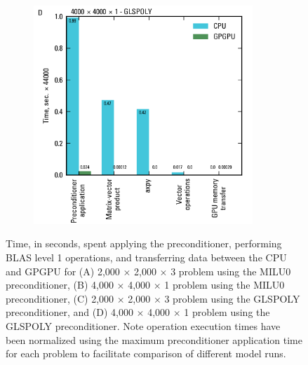\documentclass[12pt]{article}
\begin{document}
\begin{figure}[hp]
\begin{subfigure}[b]{0.5\textwidth}
	\end{subfigure}
	\begin{subfigure}[b]{0.5\textwidth}
		\centering
  		\includegraphics[width=8.25cm]{Figure4d.png}
	\end{subfigure}
 	\caption{Time, in seconds, spent applying the preconditioner, performing BLAS level 1 operations, and transferring data between the CPU and GPGPU for (A) 2,000 $\times$ 2,000 $\times$ 3 problem using the MILU0 preconditioner, (B) 4,000 $\times$ 4,000 $\times$ 1 problem using the MILU0 preconditioner, (C) 2,000 $\times$ 2,000 $\times$ 3 problem using the GLSPOLY preconditioner, and (D) 4,000 $\times$ 4,000 $\times$ 1 problem using the GLSPOLY preconditioner. Note operation execution times have been normalized using the maximum preconditioner application time for each problem to facilitate comparison of different model runs.}
	\label{FigBLASOperationResults}
\end{figure}
\end{document}

